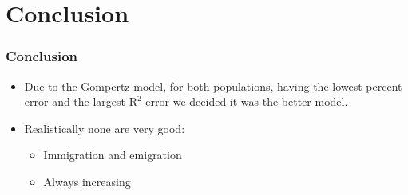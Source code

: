 \documentclass[11pt,letterpaper]{beamer}
\begin{document}
	
\section{Conclusion}

	\begin{frame}
		\frametitle{Conclusion}
		\begin{itemize}
			\item Due to the Gompertz model, for both populations, having the lowest percent error and the largest $ \text{R}^2 $ error we decided it was the better model.\\
			\item Realistically none are very good:\\
			\begin{itemize}
				\item Immigration and emigration\\
				\item Always increasing
			\end{itemize}
		\end{itemize}
		
	\end{frame}
\end{document}
